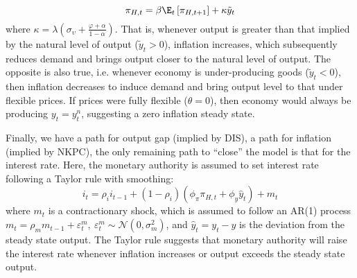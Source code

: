 \begin{equation}
    \pi_{H,t} = \beta \E_t \left[ \pi_{H,t+1}\right] + \kappa \tilde{y}_t
\end{equation}
where $\kappa=\lambda\left( \sigma_\upsilon + \frac{\varphi + \alpha}{1-\alpha}\right)$. That is, whenever output is greater than that implied by the natural level of output ($\tilde{y}_t > 0$), inflation increases, which subsequently reduces demand and brings output closer to the natural level of output. The opposite is also true, i.e. whenever economy is under-producing goods ($\tilde{y}_t < 0$), then inflation decreases to induce demand and bring output level to that under flexible prices. If prices were fully flexible ($\theta = 0$), then economy would always be producing $y_t = y^n_t$, suggesting a zero inflation steady state.

Finally, we have a path for output gap (implied by DIS), a path for inflation (implied by NKPC), the only remaining path to ``close'' the model is that for the interest rate. Here, the monetary authority is assumed to set interest rate following a Taylor rule with smoothing:
\begin{equation}
    i_t = \rho_i i_{t-1} + (1-\rho_i)(\phi_\pi \pi_{H,t}+ \phi_y \hat{y}_t) + m_t
\end{equation}
where $m_t$ is a contractionary shock, which is assumed to follow an AR(1) process $m_t = \rho_m m_{t-1} + \varepsilon^m_{t},\ \varepsilon^m_{t} \sim \mathcal{N}(0,\sigma^2_m)$, and $\hat{y}_t = y_t - y$ is the deviation from the steady state output. The Taylor rule suggests that monetary authority will raise the interest rate whenever inflation increases or output exceeds the steady state output.